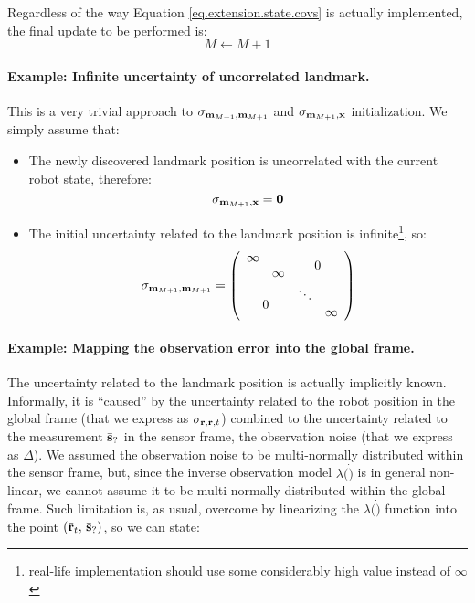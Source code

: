 	\begin{important}
		Regardless of the way Equation \ref{eq.extension.state.covs} is actually implemented, the final update to be performed is:
		\begin{equation}
			M \leftarrow M + 1
		\end{equation}
	\end{important}
	
	\paragraph{Example: Infinite uncertainty of uncorrelated landmark.}
		This is a very trivial approach to $\sigma_{\boldsymbol{\mathrm{{m}}}_{M+1},\boldsymbol{\mathrm{{m}}}_{M+1}}$ and $\sigma_{\boldsymbol{\mathrm{{m}}}_{M+1},\boldsymbol{\mathrm{{x}}}}$ initialization.
		We simply assume that:
		\begin{itemize}
			\item The newly discovered landmark position is uncorrelated with the current robot state, therefore: 
				\[
					\sigma_{\boldsymbol{\mathrm{{m}}}_{M+1},\boldsymbol{\mathrm{{x}}}} = \boldsymbol{\mathrm{{0}}}
				\]
			\item The initial uncertainty related to the landmark position is infinite\footnote{real-life implementation should use some considerably high value instead of $\infty$}, so:
				\[
					\sigma_{\vect{m}_{M+1},\vect{m}_{M+1}} = 
					\left(\begin{array}{cccc}
						\infty & & \multicolumn{2}{c}{\multirow{2}{*}{$0$}}\\
						& \infty & & \\
						\multicolumn{2}{c}{\multirow{2}{*}{$0$}} & \ddots & \\
						& & & \infty 
					\end{array}\right)
				\]
		\end{itemize}
		
	\paragraph{Example: Mapping the observation error into the global frame.}
		The uncertainty related to the landmark position is actually implicitly known.
		Informally, it is ``caused'' by the uncertainty related to the robot position in the global frame (that we express as $\sigma_{\boldsymbol{\mathrm{{r}}}, \boldsymbol{\mathrm{{r}}}, t}$) combined to the uncertainty related to the measurement $\bar{\boldsymbol{\mathrm{{s}}}}_?$ in the sensor frame, \ie{} the observation noise (that we express as $\Delta$).
		We assumed the observation noise to be multi-normally distributed within the sensor frame, but, since the inverse observation model $\lambda(\dot)$ is in general non-linear, we cannot assume it to be multi-normally distributed within the global frame.
		Such limitation is, as usual, overcome by linearizing the $\lambda(\dot)$ function into the point $(\bar{\boldsymbol{\mathrm{{r}}}}_t,\, \bar{\boldsymbol{\mathrm{{s}}}}_?)$, so we can state:
